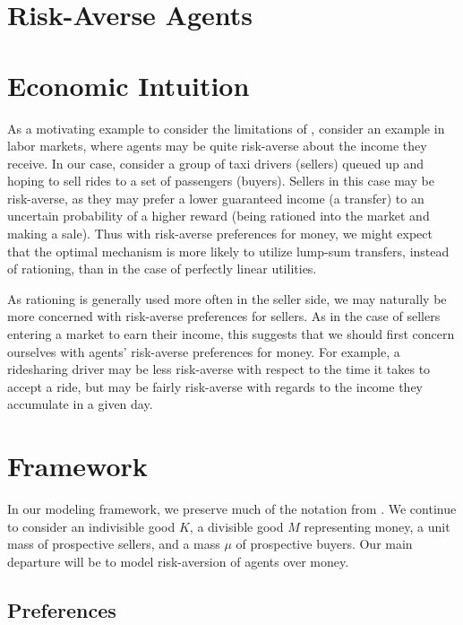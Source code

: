 \documentclass[AER]{AEA}
\begin{document}
\section{Risk-Averse Agents}

\section{Economic Intuition}

As a motivating example to consider the limitations of \cite{dworczak-2020}, consider an example in labor markets, where agents may be quite risk-averse about the income they receive. In our case, consider a group of taxi drivers (sellers) queued up and hoping to sell rides to a set of passengers (buyers). Sellers in this case may be risk-averse, as they may prefer a lower guaranteed income (a transfer) to an uncertain probability of a higher reward (being rationed into the market and making a sale). Thus with risk-averse preferences for money, we might expect that the optimal mechanism is more likely to utilize lump-sum transfers, instead of rationing, than in the case of perfectly linear utilities.


As rationing is generally used more often in the seller side, we may naturally be more concerned with risk-averse preferences for sellers. As in the case of sellers entering a market to earn their income, this suggests that we should first concern ourselves with agents' risk-averse preferences for money. For example, a ridesharing driver may be less risk-averse with respect to the time it takes to accept a ride, but may be fairly risk-averse with regards to the income they accumulate in a given day.

\section{Framework}

In our modeling framework, we preserve much of the notation from \cite{dworczak-2020}. We continue to consider an indivisible good $K$, a divisible good $M$ representing money, a unit mass of prospective sellers, and a mass $\mu$ of prospective buyers. Our main departure will be to model risk-aversion of agents over money.

\subsection{Preferences}
\end{document}
